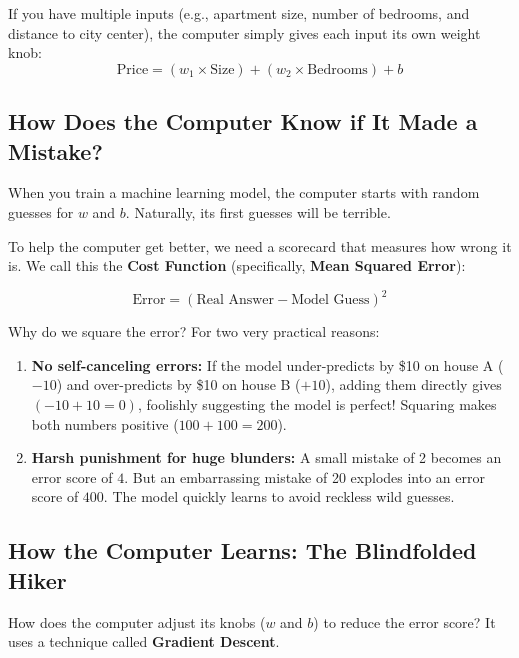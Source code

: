 \documentclass[11pt,journal,onecolumn]{IEEEtran}
\begin{document}
If you have multiple inputs (e.g., apartment size, number of bedrooms, and distance to city center), the computer simply gives each input its own weight knob:
$$\text{Price} = (w_1 \times \text{Size}) + (w_2 \times \text{Bedrooms}) + b$$

\subsection{How Does the Computer Know if It Made a Mistake?}
When you train a machine learning model, the computer starts with random guesses for $w$ and $b$. Naturally, its first guesses will be terrible. 

To help the computer get better, we need a scorecard that measures how wrong it is. We call this the \textbf{Cost Function} (specifically, \textbf{Mean Squared Error}):

\begin{equation}
\text{Error} = (\text{Real Answer} - \text{Model Guess})^2
\end{equation}

\noindent Why do we square the error? For two very practical reasons:
\begin{enumerate}
    \item \textbf{No self-canceling errors:} If the model under-predicts by \$10 on house A ($-10$) and over-predicts by \$10 on house B ($+10$), adding them directly gives $(-10 + 10 = 0)$, foolishly suggesting the model is perfect! Squaring makes both numbers positive ($100 + 100 = 200$).
    \item \textbf{Harsh punishment for huge blunders:} A small mistake of 2 becomes an error score of $4$. But an embarrassing mistake of 20 explodes into an error score of $400$. The model quickly learns to avoid reckless wild guesses.
\end{enumerate}

\subsection{How the Computer Learns: The Blindfolded Hiker}
How does the computer adjust its knobs ($w$ and $b$) to reduce the error score? It uses a technique called \textbf{Gradient Descent}.
\end{document}
